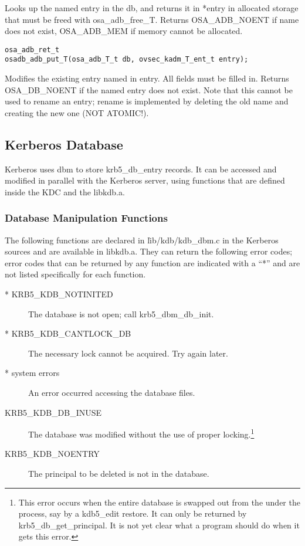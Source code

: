 Looks up the named entry in the db, and returns it in *entry in
allocated storage that must be freed with osa_adb_free_T.  Returns
OSA_ADB_NOENT if name does not exist, OSA_ADB_MEM if memory cannot be
allocated.

\begin{verbatim}
osa_adb_ret_t
osadb_adb_put_T(osa_adb_T_t db, ovsec_kadm_T_ent_t entry);
\end{verbatim}

Modifies the existing entry named in entry.  All fields must be filled
in.  Returns OSA_DB_NOENT if the named entry does not exist.  Note
that this cannot be used to rename an entry; rename is implemented by
deleting the old name and creating the new one (NOT ATOMIC!).

\subsection{Kerberos Database}

Kerberos uses dbm to store krb5_db_entry records.  It can be accessed
and modified in parallel with the Kerberos server, using functions
that are defined inside the KDC and the libkdb.a.

\subsubsection{Database Manipulation Functions}

The following functions are declared in \v{lib/kdb/kdb_dbm.c} in the
Kerberos sources and are available in libkdb.a.  They can return the
following error codes; error codes that can be returned by any
function are indicated with a ``*'' and are not listed specifically
for each function.

\begin{description}
\item[* KRB5_KDB_NOTINITED] The database is not open; call
krb5_dbm_db_init.
\item[* KRB5_KDB_CANTLOCK_DB] The necessary lock cannot be acquired.  Try
again later.
\item[* system errors] An error occurred accessing the database files.
\item[KRB5_KDB_DB_INUSE] The database was modified without the use
of proper locking.\footnote{This error occurs when the entire database
is swapped out from the under the process, say by a kdb5_edit restore.
It can only be returned by krb5_db_get_principal.  It is not yet clear
what a program should do when it gets this error.}
\item[KRB5_KDB_NOENTRY] The principal to be deleted is not
in the database.
\end{description}

